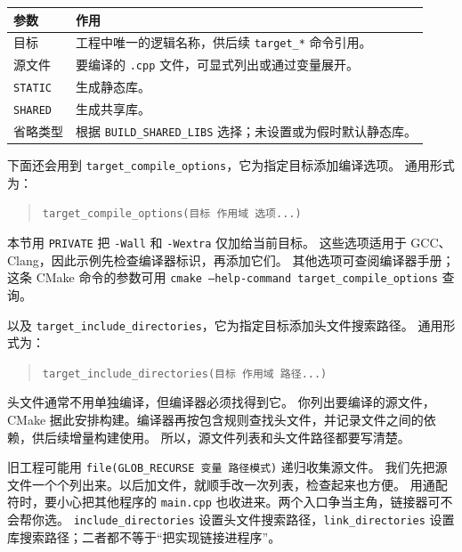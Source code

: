 \begin{center}
\begin{tabular}{p{}p{}}
\toprule[1.5pt]
参数 & 作用 \\
\midrule[1pt]
目标 & 工程中唯一的逻辑名称，供后续 \texttt{target\_*} 命令引用。\\
源文件 & 要编译的 \texttt{.cpp} 文件，可显式列出或通过变量展开。\\
\texttt{STATIC} & 生成静态库。\\
\texttt{SHARED} & 生成共享库。\\
省略类型 & 根据 \texttt{BUILD\_SHARED\_LIBS} 选择；未设置或为假时默认静态库。\\
\bottomrule[1.5pt]
\end{tabular}
\end{center}

下面还会用到 \texttt{target\_compile\_options}，它为指定目标添加编译选项。
通用形式为：
\begin{quote}
\texttt{target\_compile\_options(目标 作用域 选项...)}
\end{quote}
本节用 \texttt{PRIVATE} 把 \texttt{-Wall} 和 \texttt{-Wextra} 仅加给当前目标。
这些选项适用于 GCC、Clang，因此示例先检查编译器标识，再添加它们。
其他选项可查阅编译器手册；这条 CMake 命令的参数可用
\texttt{cmake --help-command target\_compile\_options} 查询。

以及 \texttt{target\_include\_directories}，它为指定目标添加头文件搜索路径。
通用形式为：
\begin{quote}
\texttt{target\_include\_directories(目标 作用域 路径...)}
\end{quote}

头文件通常不用单独编译，但编译器必须找得到它。
你列出要编译的源文件，CMake 据此安排构建。编译器再按包含规则查找头文件，并记录文件之间的依赖，供后续增量构建使用。
所以，源文件列表和头文件路径都要写清楚。

\begin{note}
旧工程可能用 \texttt{file(GLOB\_RECURSE 变量 路径模式)} 递归收集源文件。
我们先把源文件一个个列出来。以后加文件，就顺手改一次列表，检查起来也方便。
用通配符时，要小心把其他程序的 \texttt{main.cpp} 也收进来。两个入口争当主角，链接器可不会帮你选。
\texttt{include\_directories} 设置头文件搜索路径，\texttt{link\_directories} 设置库搜索路径；二者都不等于“把实现链接进程序”。
\end{note}

